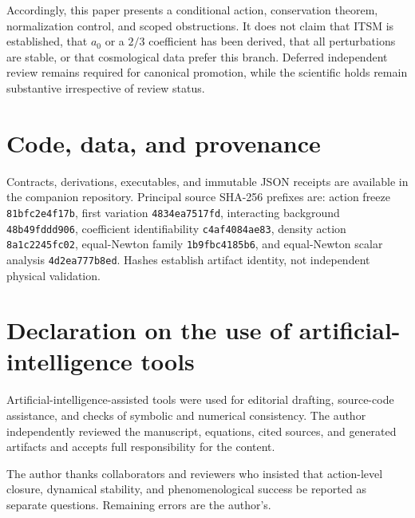 \documentclass[aps,prd,reprint,superscriptaddress,nofootinbib,floatfix]{revtex4-2}
\begin{document}
Accordingly, this paper presents a conditional action, conservation theorem,
normalization control, and scoped obstructions.  It does not claim that ITSM
is established, that \(a_0\) or a \(2/3\) coefficient has been derived, that
all perturbations are stable, or that cosmological data prefer this branch.
Deferred independent review remains required for canonical promotion, while
the scientific holds remain substantive irrespective of review status.

\section*{Code, data, and provenance}

Contracts, derivations, executables, and immutable JSON receipts are available
in the companion repository.  Principal source SHA-256 prefixes are:
action freeze \texttt{81bfc2e4f17b}, first variation
\texttt{4834ea7517fd}, interacting background \texttt{48b49fddd906},
coefficient identifiability \texttt{c4af4084ae83}, density action
\texttt{8a1c2245fc02}, equal-Newton family \texttt{1b9fbc4185b6}, and
equal-Newton scalar analysis \texttt{4d2ea777b8ed}.  Hashes establish artifact
identity, not independent physical validation.

\section*{Declaration on the use of artificial-intelligence tools}

Artificial-intelligence-assisted tools were used for editorial drafting,
source-code assistance, and checks of symbolic and numerical consistency.
The author independently reviewed the manuscript, equations, cited sources,
and generated artifacts and accepts full responsibility for the content.

\begin{acknowledgments}
The author thanks collaborators and reviewers who insisted that action-level
closure, dynamical stability, and phenomenological success be reported as
separate questions.  Remaining errors are the author's.
\end{acknowledgments}


\end{document}
